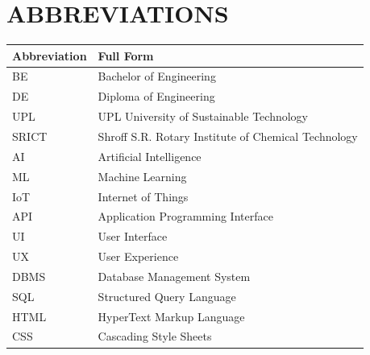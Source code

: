 
\chapter*{ABBREVIATIONS}


\begin{center}

\begin{longtable}{
    p{}
    p{}
}

\toprule

\textbf{Abbreviation}
&
\textbf{Full Form}
\\

\midrule

BE
&
Bachelor of Engineering
\\

DE
&
Diploma of Engineering
\\

UPL
&
UPL University of Sustainable Technology
\\

SRICT
&
Shroff S.R. Rotary Institute of Chemical Technology
\\

AI
&
Artificial Intelligence
\\

ML
&
Machine Learning
\\

IoT
&
Internet of Things
\\

API
&
Application Programming Interface
\\

UI
&
User Interface
\\

UX
&
User Experience
\\

DBMS
&
Database Management System
\\

SQL
&
Structured Query Language
\\

HTML
&
HyperText Markup Language
\\

CSS
&
Cascading Style Sheets
\\

\bottomrule

\end{longtable}

\end{center}